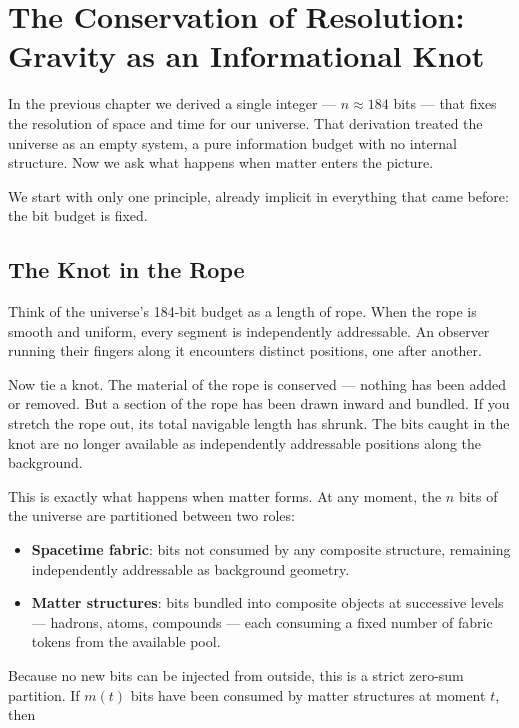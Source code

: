 \chapter{The Conservation of Resolution: Gravity as an Informational Knot}

In the previous chapter we derived a single integer --- $n \approx 184$
bits --- that fixes the resolution of space and time for our universe.
That derivation treated the universe as an empty system, a pure
information budget with no internal structure. Now we ask what happens
when matter enters the picture. 

We start with only one principle, already implicit in
everything that came before: the bit budget is fixed. 

\section{The Knot in the Rope}

Think of the universe's 184-bit budget as a length of rope. When the
rope is smooth and uniform, every segment is independently addressable.
An observer running their fingers along it encounters distinct positions,
one after another.

Now tie a knot. The material of the rope is conserved --- nothing has
been added or removed. But a section of the rope has been drawn inward
and bundled. If you stretch the rope out, its total navigable length has
shrunk. The bits caught in the knot are no longer available as
independently addressable positions along the background.

This is exactly what happens when matter forms. At any moment, the $n$
bits of the universe are partitioned between two roles:

\begin{itemize}
    \item \textbf{Spacetime fabric}: bits not consumed by any composite
    structure, remaining independently addressable as background geometry.
    \item \textbf{Matter structures}: bits bundled into composite objects
    at successive levels --- hadrons, atoms, compounds --- each consuming
    a fixed number of fabric tokens from the available pool.
\end{itemize}

Because no new bits can be injected from outside, this is a strict
zero-sum partition. If $m(t)$ bits have been consumed by matter
structures at moment $t$, then

